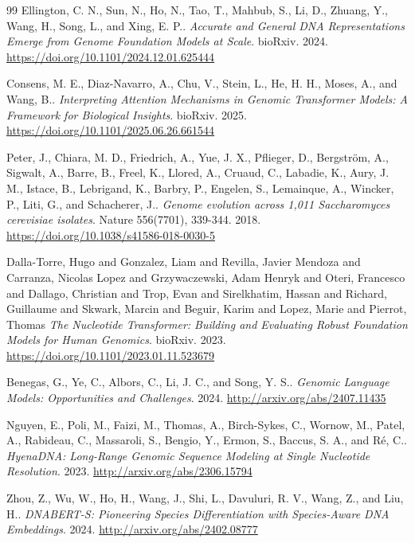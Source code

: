\documentclass{ifacconf}
\begin{document}
\begin{thebibliography}{99}
Ellington, C. N., Sun, N., Ho, N., Tao, T., Mahbub, S., Li, D., Zhuang, Y., Wang, H., Song, L., and Xing, E. P..
\textit{Accurate and General DNA Representations Emerge from Genome Foundation Models at Scale}.
bioRxiv. 2024.
\url{https://doi.org/10.1101/2024.12.01.625444}

Consens, M. E., Diaz-Navarro, A., Chu, V., Stein, L., He, H. H., Moses, A., and Wang, B..
\textit{Interpreting Attention Mechanisms in Genomic Transformer Models: A Framework for Biological Insights}.
bioRxiv. 2025.
\url{https://doi.org/10.1101/2025.06.26.661544}

Peter, J., Chiara, M. D., Friedrich, A., Yue, J. X., Pflieger, D., Bergström, A., Sigwalt, A., Barre, B., Freel, K., Llored, A., Cruaud, C., Labadie, K., Aury, J. M., Istace, B., Lebrigand, K., Barbry, P., Engelen, S., Lemainque, A., Wincker, P., Liti, G., and Schacherer, J..
\textit{Genome evolution across 1,011 Saccharomyces cerevisiae isolates}.
Nature 556(7701), 339-344. 2018.
\url{https://doi.org/10.1038/s41586-018-0030-5}

Dalla-Torre, Hugo and Gonzalez, Liam and Revilla, Javier Mendoza and Carranza, Nicolas Lopez and Grzywaczewski, Adam Henryk and Oteri, Francesco and Dallago, Christian and Trop, Evan and Sirelkhatim, Hassan and Richard, Guillaume and Skwark, Marcin and Beguir, Karim and Lopez, Marie and Pierrot, Thomas
\textit{The Nucleotide Transformer: Building and Evaluating Robust Foundation Models for Human Genomics}.
bioRxiv. 2023.
\url{https://doi.org/10.1101/2023.01.11.523679}

Benegas, G., Ye, C., Albors, C., Li, J. C., and Song, Y. S..
\textit{Genomic Language Models: Opportunities and Challenges}.
2024.
\url{http://arxiv.org/abs/2407.11435}

Nguyen, E., Poli, M., Faizi, M., Thomas, A., Birch-Sykes, C., Wornow, M., Patel, A., Rabideau, C., Massaroli, S., Bengio, Y., Ermon, S., Baccus, S. A., and Ré, C..
\textit{HyenaDNA: Long-Range Genomic Sequence Modeling at Single Nucleotide Resolution}.
2023.
\url{http://arxiv.org/abs/2306.15794}

Zhou, Z., Wu, W., Ho, H., Wang, J., Shi, L., Davuluri, R. V., Wang, Z., and Liu, H..
\textit{DNABERT-S: Pioneering Species Differentiation with Species-Aware DNA Embeddings}.
2024.
\url{http://arxiv.org/abs/2402.08777}


\end{thebibliography}
\end{document}
